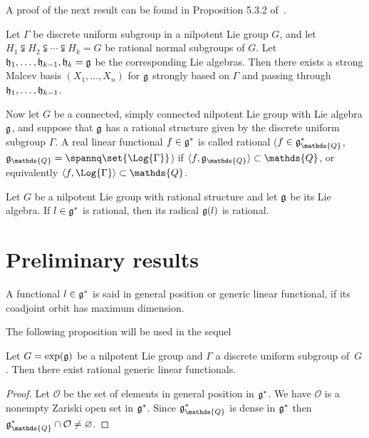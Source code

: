 A  proof of the next result can be found in Proposition 5.3.2 of~\cite{Cor1}.

\begin{proposition}\label{suite-adapte-rational}
Let $\Gamma$ be  discrete uniform subgroup in a nilpotent Lie group
$G$, and let $H_1\subsetneqq H_2\subsetneqq\cdots \subsetneqq H_k =G$
be  rational normal subgroups of $G$. Let $\frak h_1, \ldots, \frak
h_{k-1}, \frak h_k =\frak g$ be the corresponding Lie algebras. Then
there exists a strong Malcev basis $(X_1,\ldots, X_n)$ for $\frak g$
strongly based on $\Gamma$ and passing through $\frak h_1, \ldots,
\frak h_{k-1}$.
\end{proposition}


 Now let $G$ be a connected, simply connected nilpotent Lie
group with Lie algebra $\frak g$, and suppose that $\frak g$ has a
rational structure given by  the discrete uniform subgroup $\Gamma$.
A real linear functional $f \in \frak g^*$ is called rational ($f\in
\frak g_\mathds{Q}^*$,  $\frak
g_\mathds{Q}=\spannq\set{\Log{\Gamma}}$) if $\langle f, \frak
g_\mathds{Q}\rangle \subset \mathds{Q}$, or equivalently $\langle f,
\Log{\Gamma} \rangle \subset \mathds{Q}$.


\begin{proposition} Let $G$ be a nilpotent Lie group with rational
structure and let $\frak g$ be its Lie algebra. If $l\in \frak g^*$
is rational, then its radical $\frak g(l)$ is rational.
\end{proposition}


\section{Preliminary  results}\label{section3}


\begin{definition} A functional $l\in \frak g^*$ is said in general
position or generic linear functional, if its coadjoint orbit has
maximum dimension.
\end{definition}
 The following proposition will be used in the sequel

\begin{proposition}\label{rational-functional}
Let $G = \exp(\frak g)$ be a nilpotent Lie group and $\Gamma$ a
discrete uniform subgroup of~$G$. Then there exist rational generic
linear functionals.
\end{proposition}

\begin{proof}
Let $\mathcal{O}$ be the set of elements in general position in
$\frak g^*$. We have $\mathcal{O}$ is a nonempty Zariski open set
in $\frak g^*$. Since $\frak g_\mathds{Q}^* $ is dense in $\frak
g^*$ then $\frak g_\mathds{Q}^*\cap \mathcal{O} \ne \varnothing$.
\end{proof}


